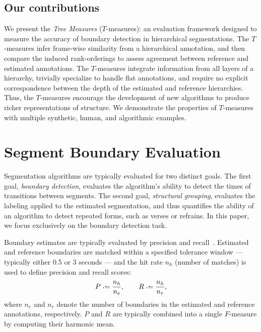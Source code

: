 \documentclass{article}
\begin{document}
\subsection{Our contributions}
\sloppy
We present the \emph{Tree Measures} ($T$-measures): an evaluation framework designed
to measure the accuracy of boundary detection in hierarchical segmentations.
The $T$-measures infer frame-wise similarity from a hierarchical annotation, and then
compare the induced rank-orderings to assess agreement between reference and estimated annotations.
The $T$-measures integrate information from all layers of a hierarchy, trivially
specialize to handle flat annotations, and require no explicit correspondence between the
depth of the estimated and reference hierarchies.
Thus, the $T$-measures encourage the development of new algorithms to produce richer representations of structure.
We demonstrate the properties of $T$-measures with multiple synthetic, human, and algorithmic examples.


\section{Segment Boundary Evaluation}\label{sec:curr_meth}

Segmentation algorithms are typically evaluated for two distinct goals.  
The first goal, \emph{boundary detection}, evaluates the algorithm's ability to detect the times of transitions between segments.
The second goal, \emph{structural grouping}, evaluates the labeling applied to the estimated segmentation, and thus quantifies the ability of an algorithm to detect repeated forms, such as verses or refrains. 
In this paper, we focus exclusively on the boundary detection task.

Boundary estimates are typically evaluated by precision and recall~\cite{turnbull2007supervised}.
Estimated and reference boundaries are matched within a specified tolerance window --- typically either 0.5 or 3 seconds --- and the hit rate $n_h$ (number of matches) is used to define precision and recall scores:
\begin{equation}
P \defeq \frac{n_h}{n_e}, \quad\quad R \defeq \frac{n_h}{n_r},
\end{equation}
where $n_e$ and $n_r$ denote the number of boundaries in the estimated and reference
annotations, respectively.
$P$ and $R$ are typically combined into a single $F$-measure by computing their harmonic mean.
\end{document}
